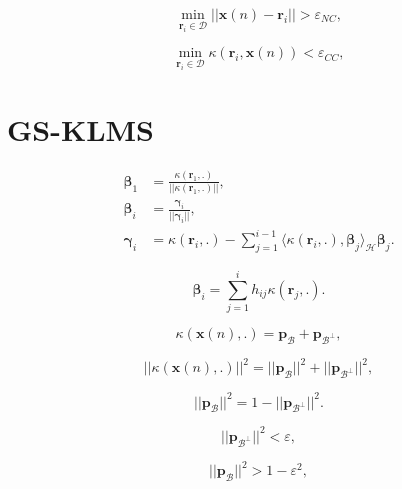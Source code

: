 \begin{equation}
    \min_{\mathbf{r}_i \in \mathcal{D}} ||\mathbf{x}(n) - \mathbf{r}_i||>\varepsilon_{NC},
\end{equation}

\begin{equation}
    \min_{\mathbf{r}_i \in \mathcal{D}} \kappa(\mathbf{r}_i,\mathbf{x}(n)) < \varepsilon_{CC},
\end{equation}



\section{GS-KLMS}

\begin{align}
    \boldsymbol{\beta}_1 &= \frac{\kappa(\mathbf{r}_1,.)}{||\kappa(\mathbf{r}_1,.)||},\label{eq:beta_1}\\
    \boldsymbol{\beta}_i &= \frac{\boldsymbol{\gamma}_i}{||\boldsymbol{\gamma}_i||}, \label{eq:beta_i}\\ 
    \boldsymbol{\gamma}_i &= \kappa(\mathbf{r}_i,.) - \sum_{j=1}^{i-1}\langle\kappa(\mathbf{r}_i,.),\boldsymbol{\beta}_j\rangle_{\mathcal{H}}\boldsymbol{\beta}_j.\label{eq:gamma_i}
\end{align}

\begin{equation}
    \boldsymbol{\beta}_i = \sum_{j=1}^{i} h_{ij}\kappa(\mathbf{r}_j,.).
\end{equation}

\begin{equation}
    \kappa(\mathbf{x}(n),.) = \mathbf{p}_{\mathcal{B}} + \mathbf{p}_{\mathcal{B}^{\perp}},
\end{equation}

\begin{equation}
    ||\kappa(\mathbf{x}(n),.)||^2 = ||\mathbf{p}_\mathcal{B}||^2 + ||\mathbf{p}_{\mathcal{B}^{\perp}}||^2,
\end{equation}

\begin{equation}
    ||\mathbf{p}_\mathcal{B}||^2 = 1 - ||\mathbf{p}_{\mathcal{B}^{\perp}}||^2.
\end{equation}

\begin{equation}
    ||\mathbf{p}_{\mathcal{B}^{\perp}}||^2 < \varepsilon,
\end{equation}

\begin{equation}
    ||\mathbf{p}_\mathcal{B}||^2 > 1 - \varepsilon^2,
\end{equation}

